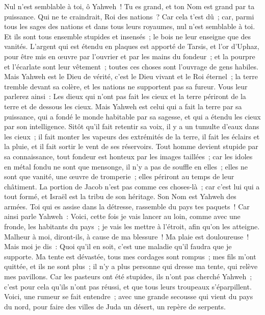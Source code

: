 \begin{multicols}{2}
Nul n'est semblable à toi, ô Yahweh~! Tu es grand, et ton Nom est grand par ta puissance.
Qui ne te craindrait, Roi des nations~? Car cela t'est dû~; car, parmi tous les sages des nations et dans tous leurs royaumes, nul n'est semblable à toi.
Et ils sont tous ensemble stupides et insensés~; le bois ne leur enseigne que des vanités.
L'argent qui est étendu en plaques est apporté de Tarsis, et l'or d'Uphaz, pour être mis en œuvre par l'ouvrier et par les mains du fondeur~; et la pourpre et l'écarlate sont leur vêtement~; toutes ces choses sont l'ouvrage de gens habiles.
Mais Yahweh est le Dieu de vérité, c'est le Dieu vivant et le Roi éternel~; la terre tremble devant sa colère, et les nations ne supportent pas sa fureur.
Vous leur parlerez ainsi~: Les dieux qui n'ont pas fait les cieux et la terre périront de la terre et de dessous les cieux.
Mais Yahweh est celui qui a fait la terre par sa puissance, qui a fondé le monde habitable par sa sagesse, et qui a étendu les cieux par son intelligence.
Sitôt qu'il fait retentir sa voix, il y a un tumulte d'eaux dans les cieux~; il fait monter les vapeurs des extrémités de la terre, il fait les éclairs et la pluie, et il fait sortir le vent de ses réservoirs.
Tout homme devient stupide par sa connaissance, tout fondeur est honteux par les images taillées~; car les idoles en métal fondu ne sont que mensonge, il n'y a pas de souffle en elles~;
elles ne sont que vanité, une œuvre de tromperie~; elles périront au temps de leur châtiment.
La portion de Jacob n'est pas comme ces choses-là~; car c'est lui qui a tout formé, et Israël est la tribu de son héritage. Son Nom est Yahweh des armées.
Toi qui es assise dans la détresse, rassemble du pays tes paquets~!
Car ainsi parle Yahweh~: Voici, cette fois je vais lancer au loin, comme avec une fronde, les habitants du pays~; je vais les mettre à l'étroit, afin qu'on les atteigne.
Malheur à moi, diront-ils, à cause de ma blessure~! Ma plaie est douloureuse~! Mais moi je dis~: Quoi qu'il en soit, c'est une maladie qu'il faudra que je supporte.
Ma tente est dévastée, tous mes cordages sont rompus~; mes fils m'ont quittée, et ils ne sont plus~; il n'y a plus personne qui dresse ma tente, qui relève mes pavillons.
Car les pasteurs ont été stupides, ils n'ont pas cherché Yahweh~; c'est pour cela qu'ils n'ont pas réussi, et que tous leurs troupeaux s'éparpillent.
Voici, une rumeur se fait entendre~; avec une grande secousse qui vient du pays du nord, pour faire des villes de Juda un désert, un repère de serpents.

\end{multicols}
